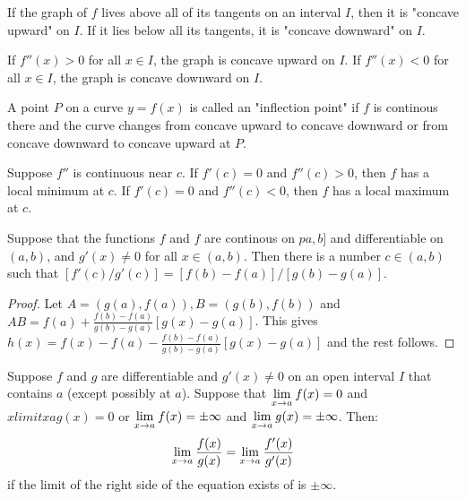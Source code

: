 \documentclass[a4paper,11pt]{article}
\begin{document}
\begin{outline}
    If the graph of \(f\) lives above all of its tangents on an interval \(I\), then it is "concave upward"
    on \(I\). If it lies below all its tangents, it is "concave downward" on \(I\).
    
    If \(f''(x) > 0\) for all \(x \in I\), the graph is concave upward on \(I\). If \(f''(x) < 0\) for all
    \(x \in I\), the graph is concave downward on \(I\).
    
    A point \(P\) on a curve \(y = f(x)\) is called an "inflection point" if \(f\) is continous there
    and the curve changes from concave upward to concave downward or from concave downward to concave upward at
    \(P\).
    
    Suppose \(f''\) is continuous near \(c\). If \(f'(c) = 0\) and \(f''(c) > 0\), then \(f\) has a local minimum at
    \(c\). If \(f'(c) = 0\) and \(f''(c) < 0\), then \(f\) has a local maximum at \(c\).
    
    Suppose that the functions \(f\) and \(f\) are continous on \(pa, b]\) and differentiable on \((a, b)\), and
    \(g'(x) \neq 0\) for all \(x \in (a, b)\). Then there is a number \(c \in (a, b)\) such that \([f'(c)/g'(c)] =
    [f(b)-f(a)]/[g(b)-g(a)]\).
    
    \begin{proof}
      Let \(A = (g(a), f(a)), B = (g(b), f(b))\) and \(AB = f(a) + \frac{f(b)-f(a)}{g(b)-g(a)}[g(x)-g(a)]\).
      This gives \(h(x) = f(x)-f(a)-\frac{f(b)-f(a)}{g(b)-g(a)}[g(x)-g(a)]\) and the rest follows.
    \end{proof}
    
    Suppose \(f\) and \(g\) are differentiable and \(g'(x) \neq 0\) on an open interval \(I\) that contains \(a\)
    (except possibly at \(a\)). Suppose that \(\lim\limits_{x\rightarrow a^{}}f(x) = 0\) and \(xlimit{x}{a}g(x) = 0\) or 
    \(\lim\limits_{x\rightarrow a^{}}f(x) = \pm\infty\) and \(\lim\limits_{x\rightarrow a^{}}g(x) = \pm\infty\). Then:
    \[
      \lim\limits_{x\rightarrow a^{}}\frac{f(x)}{g(x)} = \lim\limits_{x\rightarrow a^{}}\frac{f'(x)}{g'(x)}
    \]
    if the limit of the right side of the equation exists of is \(\pm\infty\).
    

\end{outline}
\end{document}
